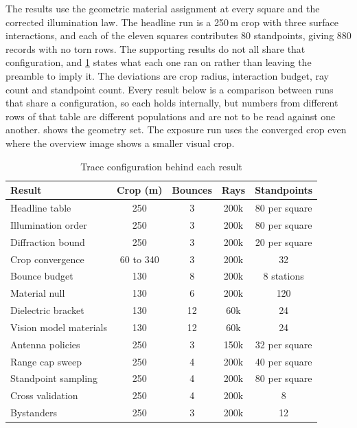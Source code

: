 \documentclass[journal]{IEEEtran}
\begin{document}
The results use the geometric material assignment at every square and the
corrected illumination law. The headline run is a 250\,m crop with three surface
interactions, and each of
the eleven squares contributes 80 standpoints, giving 880 records with no torn
rows. The supporting results do not all share that configuration, and
\cref{tab:configs} states what each one ran on rather than leaving the preamble
to imply it. The deviations are crop radius, interaction budget, ray count and
standpoint count. Every result below is a comparison between runs that share a
configuration, so each holds internally, but numbers from different rows of that
table are different populations and are not to be read against one another.
 shows the geometry set. The exposure run uses the
converged crop even where the overview image shows a smaller visual crop.

\begin{table}[!t]
  \caption{Trace configuration behind each result}
  \label{tab:configs}
  \centering
  \setlength{\tabcolsep}{4pt}
  \begin{tabular}{lcccc}
    \toprule
    Result & Crop (m) & Bounces & Rays & Standpoints \\
    \midrule
    Headline table & 250 & 3 & 200k & 80 per square \\
    Illumination order & 250 & 3 & 200k & 80 per square \\
    Diffraction bound & 250 & 3 & 200k & 20 per square \\
    Crop convergence & 60 to 340 & 3 & 200k & 32 \\
    Bounce budget & 130 & 8 & 200k & 8 stations \\
    Material null & 130 & 6 & 200k & 120 \\
    Dielectric bracket & 130 & 12 & 60k & 24 \\
    Vision model materials & 130 & 12 & 60k & 24 \\
    Antenna policies & 250 & 3 & 150k & 32 per square \\
    Range cap sweep & 250 & 4 & 200k & 40 per square \\
    Standpoint sampling & 250 & 4 & 200k & 80 per square \\
    Cross validation & 250 & 4 & 200k & 8 \\
    Bystanders & 250 & 3 & 200k & 12 \\
    \bottomrule
  \end{tabular}
\end{table}
\end{document}
